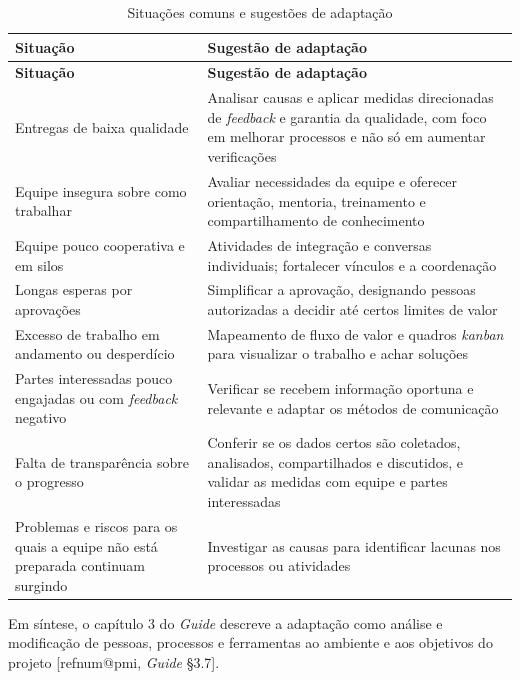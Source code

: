 \documentclass[11pt,a4paper]{article}
\makeatletter
\newcommand{\refnum}[1]{\csname refnum@#1\endcsname}
\newcommand{\cit}[1]{[\refnum{#1}]}
\newcommand{\SingleSpacing}{}
\newcommand{\fontetab}[1]{\par\vspace{3pt}{\small\noindent Fonte: #1\par}}
\makeatother
\begin{document}
\begingroup\SingleSpacing\small
\begin{longtable}{@{}>{\raggedright\arraybackslash}p{}>{\raggedright\arraybackslash}p{}@{}}
\caption{Situações comuns e sugestões de adaptação}\label{tab:t11}\\
\toprule
\textbf{Situação} & \textbf{Sugestão de adaptação}\\
\midrule
\endfirsthead
\toprule
\textbf{Situação} & \textbf{Sugestão de adaptação}\\
\midrule
\endhead
\bottomrule
\endfoot
\bottomrule
\endlastfoot
Entregas de baixa qualidade & Analisar causas e aplicar medidas direcionadas de \textit{feedback} e garantia da qualidade, com foco em melhorar processos e não só em aumentar verificações\\[3pt]
Equipe insegura sobre como trabalhar & Avaliar necessidades da equipe e oferecer orientação, mentoria, treinamento e compartilhamento de conhecimento\\[3pt]
Equipe pouco cooperativa e em silos & Atividades de integração e conversas individuais; fortalecer vínculos e a coordenação\\[3pt]
Longas esperas por aprovações & Simplificar a aprovação, designando pessoas autorizadas a decidir até certos limites de valor\\[3pt]
Excesso de trabalho em andamento ou desperdício & Mapeamento de fluxo de valor e quadros \textit{kanban} para visualizar o trabalho e achar soluções\\[3pt]
Partes interessadas pouco engajadas ou com \textit{feedback} negativo & Verificar se recebem informação oportuna e relevante e adaptar os métodos de comunicação\\[3pt]
Falta de transparência sobre o progresso & Conferir se os dados certos são coletados, analisados, compartilhados e discutidos, e validar as medidas com equipe e partes interessadas\\[3pt]
Problemas e riscos para os quais a equipe não está preparada continuam surgindo & Investigar as causas para identificar lacunas nos processos ou atividades\\[3pt]
\end{longtable}
\endgroup
\fontetab{Elaborado pelos autores (2026), com base em \cit{pmi}.}

Em síntese, o capítulo 3 do \textit{Guide} descreve a adaptação como análise e modificação de pessoas, processos e ferramentas ao ambiente e aos objetivos do projeto [\refnum{pmi}, \textit{Guide} §3.7].
\end{document}
